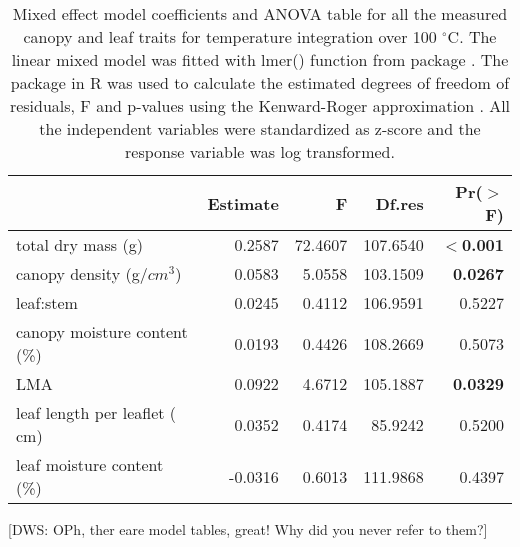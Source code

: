 \documentclass[12pt]{report}
\begin{document}
\begin{table}[ht]
\centering
\caption{Mixed effect model coefficients and ANOVA table for all the measured canopy and leaf traits for temperature integration over 100 $^{\circ}$C. The linear mixed model was fitted with lmer() function from  package \citep{bates2009package}. The  package in R \citep{fox2013hypothesis} was used to calculate the estimated degrees of freedom of residuals, F and p-values using the Kenward-Roger approximation \citep{kenward1997small}. All the independent variables were standardized  as z-score and the response variable was log transformed.}
\vspace{0.2\,cm}
\begin{tabular}{lrrrr}
  \hline
 &  Estimate & F  & Df.res & Pr($>$F) \\ 
  \hline 
  total dry mass (g) & 0.2587 & 72.4607  & 107.6540 & \textbf{$<$0.001} \\ 
  canopy density (g/{$cm^3$}) & 0.0583 & 5.0558  & 103.1509 & \textbf{0.0267} \\ 
  leaf:stem & 0.0245 & 0.4112  & 106.9591 & 0.5227 \\ 
  canopy moisture content (\%) & 0.0193 & 0.4426  & 108.2669 & 0.5073 \\ 
  LMA & 0.0922 & 4.6712 &  105.1887 & \textbf{0.0329} \\ 
  leaf length per leaflet (\,cm)  & 0.0352 & 0.4174 &  85.9242 & 0.5200 \\ 
  leaf moisture content (\%) & -0.0316 & 0.6013  & 111.9868 & 0.4397 \\ 
   \hline
\end{tabular}
\end{table}

[DWS: OPh, ther eare model tables, great! Why did you never refer to them?]
\end{document}

